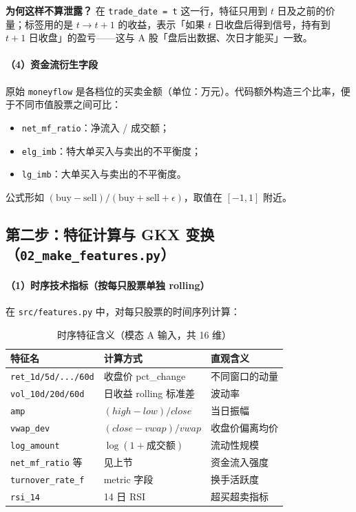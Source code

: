 \documentclass[UTF8,a4paper,12pt]{ctexart}
\begin{document}
\textbf{为何这样不算泄露？} 在 \texttt{trade\_date = t} 这一行，特征只用到 $t$ 日及之前的价量；标签用的是 $t\!\to\! t\!+\!1$ 的收益，表示「如果 $t$ 日收盘后得到信号，持有到 $t\!+\!1$ 日收盘」的盈亏——这与 A 股「盘后出数据、次日才能买」一致。

\paragraph{（4）资金流衍生字段}

原始 \texttt{moneyflow} 是各档位的买卖金额（单位：万元）。代码额外构造三个比率，便于不同市值股票之间可比：
\begin{itemize}[leftmargin=2em]
  \item \texttt{net\_mf\_ratio}：净流入 / 成交额；
  \item \texttt{elg\_imb}：特大单买入与卖出的不平衡度；
  \item \texttt{lg\_imb}：大单买入与卖出的不平衡度。
\end{itemize}
公式形如 $(\mathrm{buy}-\mathrm{sell})/(\mathrm{buy}+\mathrm{sell}+\epsilon)$，取值在 $[-1,1]$ 附近。

\subsection{第二步：特征计算与 GKX 变换（\texttt{02\_make\_features.py}）}

\paragraph{（1）时序技术指标（按每只股票单独 rolling）}

在 \texttt{src/features.py} 中，对每只股票的时间序列计算：

\begin{table}[H]
\centering
\caption{时序特征含义（模态 A 输入，共 16 维）}
\label{tab:seq-feat}
\small
\begin{tabular}{llp{6cm}}
\toprule
\textbf{特征名} & \textbf{计算方式} & \textbf{直观含义} \\
\midrule
\texttt{ret\_1d/5d/.../60d} & 收盘价 pct\_change & 不同窗口的动量 \\
\texttt{vol\_10d/20d/60d}   & 日收益 rolling 标准差 & 波动率 \\
\texttt{amp}                & $(high-low)/close$ & 当日振幅 \\
\texttt{vwap\_dev}          & $(close-vwap)/vwap$ & 收盘价偏离均价 \\
\texttt{log\_amount}        & $\log(1+\text{成交额})$ & 流动性规模 \\
\texttt{net\_mf\_ratio} 等 & 见上节 & 资金流入强度 \\
\texttt{turnover\_rate\_f}  & metric 字段 & 换手活跃度 \\
\texttt{rsi\_14}            & 14 日 RSI & 超买超卖指标 \\
\bottomrule
\end{tabular}
\end{table}
\end{document}
